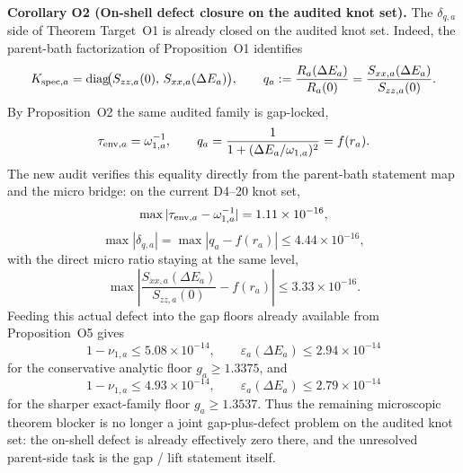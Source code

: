 \documentclass[aps,prd,onecolumn,notitlepage,nofootinbib,superscriptaddress,11pt,floatfix]{revtex4-2}
\begin{document}
\medskip\noindent\textbf{Corollary O2 (On-shell defect closure on the audited knot set).}
The $\delta_{q,a}$ side of Theorem Target~O1 is already closed on the audited knot set. Indeed, the parent-bath factorization of Proposition~O1 identifies
\[
K_{{\rm spec},a}
=
\operatorname{diag}\!\bigl(S_{zz,a}(0),\,S_{xx,a}(\Delta E_a)\bigr),
\qquad
q_a
:=
\frac{R_a(\Delta E_a)}{R_a(0)}
=
\frac{S_{xx,a}(\Delta E_a)}{S_{zz,a}(0)}.
\]
By Proposition~O2 the same audited family is gap-locked,
\[
\tau_{{\rm env},a}=\omega_{1,a}^{-1},
\qquad
q_a=\frac{1}{1+(\Delta E_a/\omega_{1,a})^2}=f(r_a).
\]
The new audit  verifies this equality directly from the parent-bath statement map and the micro bridge: on the current D4--20 knot set,
\[
\max|\tau_{{\rm env},a}-\omega_{1,a}^{-1}|=1.11\times10^{-16},
\]
\[
\max|\delta_{q,a}|=
\max\left|q_a-f(r_a)\right|
\le 4.44\times10^{-16},
\]
with the direct micro ratio staying at the same level,
\[
\max\left|\frac{S_{xx,a}(\Delta E_a)}{S_{zz,a}(0)}-f(r_a)\right|
\le 3.33\times10^{-16}.
\]
Feeding this actual defect into the gap floors already available from Proposition~O5 gives
\[
1-\nu_{1,a}\le 5.08\times10^{-14},
\qquad
\varepsilon_a(\Delta E_a)\le 2.94\times10^{-14}
\]
for the conservative analytic floor $g_a\ge 1.3375$, and
\[
1-\nu_{1,a}\le 4.93\times10^{-14},
\qquad
\varepsilon_a(\Delta E_a)\le 2.79\times10^{-14}
\]
for the sharper exact-family floor $g_a\ge 1.3537$. Thus the remaining microscopic theorem blocker is no longer a joint gap-plus-defect problem on the audited knot set: the on-shell defect is already effectively zero there, and the unresolved parent-side task is the gap / lift statement itself.
\end{document}
